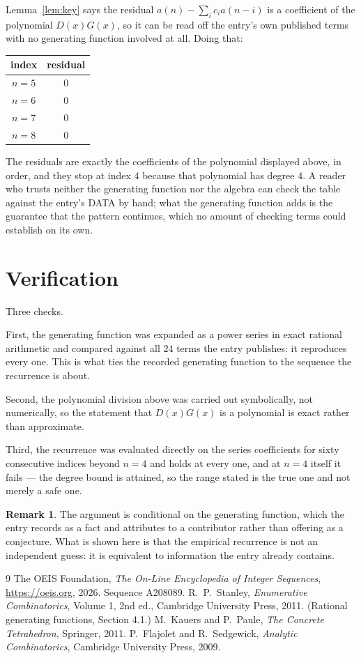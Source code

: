 \documentclass[11pt,a4paper]{article}
\theoremstyle{plain}
\theoremstyle{definition}
\newtheorem{remark}[theorem]{Remark}
\begin{document}
Lemma~\ref{lem:key} says the residual $a(n)-\sum_ic_ia(n-i)$ is a coefficient of the
polynomial $D(x)G(x)$, so it can be read off the entry's own published terms with no
generating function involved at all. Doing that:
\begin{center}
\begin{tabular}{cc}
index & residual \\ \hline
$n=5$ & $0$ \\
$n=6$ & $0$ \\
$n=7$ & $0$ \\
$n=8$ & $0$
\end{tabular}
\end{center}
The residuals are exactly the coefficients of the polynomial displayed above, in order, and
they stop at index $4$ because that polynomial has degree $4$. A reader who trusts
neither the generating function nor the algebra can check the table against the entry's DATA
by hand; what the generating function adds is the guarantee that the pattern continues, which
no amount of checking terms could establish on its own.

\section{Verification}

Three checks.

First, the generating function was expanded as a power series in exact rational arithmetic and
compared against all $24$ terms the entry publishes: it reproduces every one. This is
what ties the recorded generating function to the sequence the recurrence is about.

Second, the polynomial division above was carried out symbolically, not numerically, so the
statement that $D(x)G(x)$ is a polynomial is exact rather than approximate.

Third, the recurrence was evaluated directly on the series coefficients for sixty consecutive
indices beyond $n=4$ and holds at every one, and at $n=4$ itself it fails --- the
degree bound is attained, so the range stated is the true one and not merely a safe one.

\begin{remark}
The argument is conditional on the generating function, which the entry records as a fact and
attributes to a contributor rather than offering as a conjecture. What is shown here is that
the empirical recurrence is not an independent guess: it is equivalent to information the
entry already contains.
\end{remark}

\begin{thebibliography}{9}
 The OEIS Foundation, \emph{The On-Line Encyclopedia of Integer
Sequences}, \url{https://oeis.org}, 2026. Sequence A208089.
 R.~P.~Stanley, \emph{Enumerative Combinatorics}, Volume 1, 2nd ed.,
Cambridge University Press, 2011. (Rational generating functions, Section 4.1.)
 M.~Kauers and P.~Paule, \emph{The Concrete Tetrahedron}, Springer, 2011.
 P.~Flajolet and R.~Sedgewick, \emph{Analytic Combinatorics}, Cambridge
University Press, 2009.
\end{thebibliography}
\end{document}
